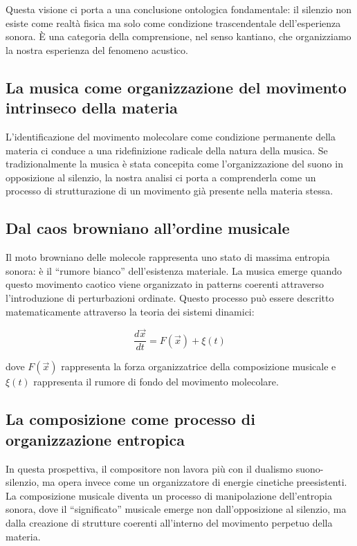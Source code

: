 \documentclass[a4paper,11pt]{article}
\begin{document}
Questa visione ci porta a una conclusione ontologica fondamentale: il
silenzio non esiste come realtà fisica ma solo come condizione
trascendentale dell'esperienza sonora. È una categoria della
comprensione, nel senso kantiano, che organizziamo la nostra esperienza
del fenomeno acustico.

\subsection{La musica come organizzazione del movimento intrinseco della
materia}\label{la-musica-come-organizzazione-del-movimento-intrinseco-della-materia}

L'identificazione del movimento molecolare come condizione permanente
della materia ci conduce a una ridefinizione radicale della natura della
musica. Se tradizionalmente la musica è stata concepita come
l'organizzazione del suono in opposizione al silenzio, la nostra analisi
ci porta a comprenderla come un processo di strutturazione di un
movimento già presente nella materia stessa.

\subsection{Dal caos browniano all'ordine
musicale}\label{dal-caos-browniano-allordine-musicale}

Il moto browniano delle molecole rappresenta uno stato di massima
entropia sonora: è il ``rumore bianco'' dell'esistenza materiale. La
musica emerge quando questo movimento caotico viene organizzato in
patterns coerenti attraverso l'introduzione di perturbazioni ordinate.
Questo processo può essere descritto matematicamente attraverso la
teoria dei sistemi dinamici:

\[\frac{d\vec{x}}{dt} = F(\vec{x}) + \xi(t)\]

dove \(F(\vec{x})\) rappresenta la forza organizzatrice della
composizione musicale e \(\xi(t)\) rappresenta il rumore di fondo del
movimento molecolare.

\subsection{La composizione come processo di organizzazione
entropica}\label{la-composizione-come-processo-di-organizzazione-entropica}

In questa prospettiva, il compositore non lavora più con il dualismo
suono-silenzio, ma opera invece come un organizzatore di energie
cinetiche preesistenti. La composizione musicale diventa un processo di
manipolazione dell'entropia sonora, dove il ``significato'' musicale
emerge non dall'opposizione al silenzio, ma dalla creazione di strutture
coerenti all'interno del movimento perpetuo della materia.
\end{document}
